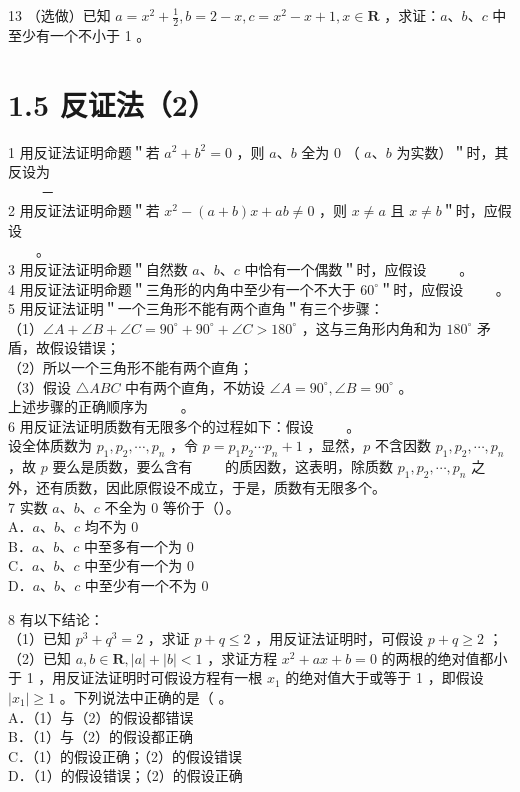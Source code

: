 \documentclass[10pt]{article}
\begin{document}
13 （选做）已知 \(a=x^{2}+\frac{1}{2}, b=2-x, c=x^{2}-x+1, x \in \mathbf{R}\) ，求证：\(a 、 b 、 c\) 中至少有一个不小于 1 。

\section*{1.5 反证法（2）}
1 用反证法证明命题＂若 \(a^{2}+b^{2}=0\) ，则 \(a 、 b\) 全为 0 （ \(a 、 b\) 为实数）＂时，其反设为 \(\qquad\)\\
\(\qquad\) －\\
2 用反证法证明命题＂若 \(x^{2}-(a+b) x+a b \neq 0\) ，则 \(x \neq a\) 且 \(x \neq b\)＂时，应假设 \(\qquad\)\\
\(\qquad\)。\\
3 用反证法证明命题＂自然数 \(a 、 b 、 c\) 中恰有一个偶数＂时，应假设 \(\qquad\)。\\
4 用反证法证明命题＂三角形的内角中至少有一个不大于 \(60^{\circ}\)＂时，应假设 \(\qquad\)。\\
5 用反证法证明＂一个三角形不能有两个直角＂有三个步骤：\\
（1）\(\angle A+\angle B+\angle C=90^{\circ}+90^{\circ}+\angle C>180^{\circ}\) ，这与三角形内角和为 \(180^{\circ}\) 矛盾，故假设错误；\\
（2）所以一个三角形不能有两个直角；\\
（3）假设 \(\triangle A B C\) 中有两个直角，不妨设 \(\angle A=90^{\circ}, \angle B=90^{\circ}\) 。\\
上述步骤的正确顺序为 \(\qquad\)。\\
6 用反证法证明质数有无限多个的过程如下：假设 \(\qquad\)。\\
设全体质数为 \(p_{1}, p_{2}, \cdots, p_{n}\) ，令 \(p=p_{1} p_{2} \cdots p_{n}+1\) ，显然，\(p\) 不含因数 \(p_{1}, p_{2}, \cdots, p_{n}\) ，故 \(p\) 要么是质数，要么含有 \(\qquad\)的质因数，这表明，除质数 \(p_{1}, p_{2}, \cdots, p_{n}\) 之外，还有质数，因此原假设不成立，于是，质数有无限多个。\\
7 实数 \(a 、 b 、 c\) 不全为 0 等价于（）。\\
A．\(a 、 b 、 c\) 均不为 0\\
B．\(a 、 b 、 c\) 中至多有一个为 0\\
C．\(a 、 b 、 c\) 中至少有一个为 0\\
D．\(a 、 b 、 c\) 中至少有一个不为 0

8 有以下结论：\\
（1）已知 \(p^{3}+q^{3}=2\) ，求证 \(p+q \leqslant 2\) ，用反证法证明时，可假设 \(p+q \geqslant 2\) ；\\
（2）已知 \(a, b \in \mathbf{R},|a|+|b|<1\) ，求证方程 \(x^{2}+a x+b=0\) 的两根的绝对值都小于 1 ，用反证法证明时可假设方程有一根 \(x_{1}\) 的绝对值大于或等于 1 ，即假设 \(\left|x_{1}\right| \geqslant 1\) 。下列说法中正确的是（ 。\\
A．（1）与（2）的假设都错误\\
B．（1）与（2）的假设都正确\\
C．（1）的假设正确；（2）的假设错误\\
D．（1）的假设错误；（2）的假设正确
\end{document}

